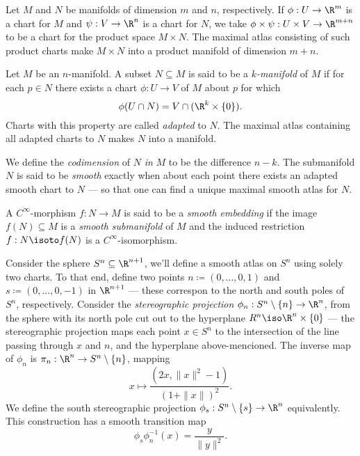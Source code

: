 \begin{definition}
\label{def:product-manifold}
Let \(M\) and \(N\) be manifolds of dimension \(m\) and \(n\), respectively. If
\(\phi: U \to \R^m\) is a chart for \(M\) and \(\psi: V \to \R^n\) is a chart
for \(N\), we take \(\phi \times \psi: U \times V \to \R^{m + n}\) to be a chart
for the product space \(M \times N\). The maximal atlas consisting of such
product charts make \(M \times N\) into a product manifold of dimension
\(m + n\).
\end{definition}

\begin{definition}[Submanifold]
\label{def:submanifold}
Let \(M\) be an \(n\)-manifold. A subset \(N \subseteq M\) is said to be a
\emph{\(k\)-manifold} of \(M\) if for each \(p \in N\) there exists a chart
\(\phi: U \to V\) of \(M\) about \(p\) for which
\[
\phi(U \cap N) = V \cap (\R^k \times \{0\}).
\]
Charts with this property are called \emph{adapted} to \(N\). The maximal atlas
containing all adapted charts to \(N\) makes \(N\) into a manifold.

We define the \emph{codimension} of \(N\) \emph{in} \(M\) to be the difference
\(n - k\). The submanifold \(N\) is said to be \emph{smooth} exactly when about
each point there exists an adapted smooth chart to \(N\) --- so that one can
find a unique maximal smooth atlas for \(N\).
\end{definition}

\begin{definition}
\label{def:smooth-embedding}
A \(C^{\infty}\)-morphism \(f: N \to M\) is said to be a \emph{smooth embedding}
if the image \(f(N) \subseteq M\) is a \emph{smooth submanifold} of \(M\) and
the induced restriction \(f: N \isoto f(N)\) is a \(C^{\infty}\)-isomorphism.
\end{definition}

\begin{example}[Sphere]
\label{exp:sphere-smooth-manifold}
Consider the sphere \(S^n \subseteq \R^{n+1}\), we'll define a smooth atlas on
\(S^n\) using solely two charts. To that end, define two points
\(n \coloneq (0, \dots, 0, 1)\) and \(s \coloneq (0, \dots, 0, -1)\) in
\(\R^{n+1}\) --- these correspon to the north and south poles of \(S^n\),
respectively. Consider the \emph{stereographic projection}
\(\phi_n: S^n \setminus \{n\} \to \R^n\), from the sphere with its north pole
cut out to the hyperplane \(R^n \iso \R^n \times \{0\}\) --- the stereographic
projection maps each point \(x \in S^n\) to the intersection of the line passing
through \(x\) and \(n\), and the hyperplane above-mencioned. The inverse map of
\(\phi_n\) is \(\pi_n: \R^n \to S^n \setminus \{n\}\), mapping
\[
x \longmapsto \frac{(2 x, \| x \|^2 - 1)}{(1 + \| x \|)^2}.
\]
We define the south stereographic projection \(\phi_s: S^n \setminus \{s\} \to
\R^n\) equivalently. This construction has a smooth transition map
\[
\phi_s \phi_n^{-1}(x) = \frac{y}{\| y \|^2}.
\]
\end{example}


